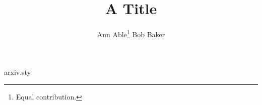 \begin{filecontents*}[overwrite]{arxiv.sty}
\providecommand{\maketitle}{}
\renewcommand{\maketitle}{%
  \par
  \begingroup
    \renewcommand{\thefootnote}{\fnsymbol{footnote}}
    \renewcommand{\@makefnmark}{\hbox to \z@{$^{\@thefnmark}$\hss}}
    \thispagestyle{empty}
    \@maketitle
    \@thanks
  \endgroup
  \let\maketitle\relax
  \let\thanks\relax
}
\providecommand{\@maketitle}{}
\renewcommand{\@maketitle}{\vbox{\hsize\textwidth\centering{\LARGE \@title\par}
  \def\And{\end{tabular}\hfil\linebreak[0]\hfil\begin{tabular}[t]{c}\ignorespaces}%
  \begin{tabular}[t]{c}\@author\end{tabular}}}
\end{filecontents*}
\documentclass{article}
\usepackage{arxiv}
\title{A Title}
\author{Ann Able\thanks{Equal contribution.} \And Bob Baker\footnotemark[1]}

\maketitle
Body.

